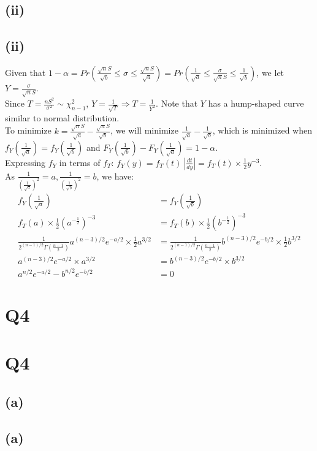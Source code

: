 \documentclass{article}
\newcommand{\mysectionstar}[2][]{%
    \ifthenelse{\equal{#1}{}}%
        {\section*{#2}}%
        {\section*[#1]{#2}}%
    \outline{1}{#2}%
}
\newcommand{\mysubsectionstar}[2][]{%
    \ifthenelse{\equal{#1}{}}%
        {\subsection*{#2}}%
        {\subsection*[#1]{#2}}%
    \outline{2}{#2}%
}
\begin{document}
\mysubsectionstar{(ii)}
Given that $1 - \alpha = Pr(\frac{\sqrt{n}S}{\sqrt{b}} \leq \sigma \leq \frac{\sqrt{n}S}{\sqrt{a}}) = Pr(\frac{1}{\sqrt{a}} \leq \frac{\sigma}{\sqrt{n}S} \leq \frac{1}{\sqrt{b}})$, we let $Y = \frac{\sigma}{\sqrt{n}S}$. \\
Since $T = \frac{nS^2}{\sigma^2} \sim \chi^2_{n-1}$, $Y =\frac{1}{\sqrt{T}} \Rightarrow T = \frac{1}{Y^2}$. Note that $Y$ has a hump-shaped curve similar to normal distribution. \\
To minimize $k = \frac{\sqrt{n}S}{\sqrt{a}} - \frac{\sqrt{n}S}{\sqrt{b}}$, we will minimize $\frac{1}{\sqrt{a}} - \frac{1}{\sqrt{b}}$, which is minimized when $f_Y(\frac{1}{\sqrt{a}}) = f_Y(\frac{1}{\sqrt{b}})$ and $F_Y(\frac{1}{\sqrt{b}}) - F_Y(\frac{1}{\sqrt{a}}) = 1 - \alpha$. \\
Expressing $f_Y$ in terms of $f_T$: $f_Y(y) = f_T(t) \ | \frac{dt}{dy} | = f_T(t) \times \frac{1}{2}y^{-3}$. \\
As $\frac{1}{(\frac{1}{\sqrt{a}})^2} = a, \frac{1}{(\frac{1}{\sqrt{b}})^2} = b$, we have:
\begin{align*}
f_Y(\frac{1}{\sqrt{a}}) &= f_Y(\frac{1}{\sqrt{b}}) \\
f_T(a) \times \frac{1}{2}(a^{-\frac{1}{2}})^{-3} &= f_T(b) \times \frac{1}{2}(b^{-\frac{1}{2}})^{-3} \\
\frac{1}{2^{(n-1)/2}\Gamma(\frac{n-1}{2})}a^{(n-3)/2}e^{-a/2} \times \frac{1}{2}a^{3/2} &= \frac{1}{2^{(n-1)/2}\Gamma(\frac{n-1}{2})}b^{(n-3)/2}e^{-b/2} \times \frac{1}{2}b^{3/2} \\
a^{(n-3)/2}e^{-a/2} \times a^{3/2} &= b^{(n-3)/2}e^{-b/2} \times b^{3/2} \\
a^{n/2}e^{-a/2} - b^{n/2}e^{-b/2} &= 0
\end{align*}

\mysectionstar{Q4}

\mysubsectionstar{(a)}
\end{document}
